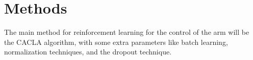 \section{Methods}
The main method for reinforcement learning for the control of the arm will be the CACLA algorithm, with some extra parameters like batch learning, normalization techniques, and the dropout technique. 
